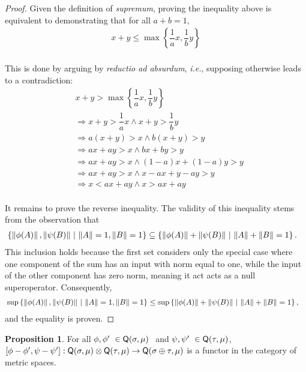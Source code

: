 \documentclass[10pt,a4paper]{amsart}
\theoremstyle{definition}
\theoremstyle{definition}
\theoremstyle{definition}
\theoremstyle{definition}
\newtheorem{proposition}[definition]{Proposition}
\theoremstyle{definition}
\theoremstyle{definition}
\begin{document}
\begin{proof}
Given the definition of \emph{supremum}, proving the inequality above is equivalent to demonstrating that for all $a+b=1$,
 \begin{align*} 
     x + y  \leq  \max \left\{   \dfrac{1}{a}x  ,   \dfrac{1}{b} y   \right\} \\
 \end{align*}
 
 This is done by arguing by \textit{reductio ad absurdum}, \textit{i.e.}, supposing otherwise leads to a contradiction:
 \begin{align*} 
     &
      x + y  >  \max \left\{   \dfrac{1}{a}x  ,   \dfrac{1}{b} y   \right\} \\
     & \Rightarrow  x + y > \dfrac{1}{a}x  \wedge x + y > \dfrac{1}{b}y \\
     & \Rightarrow  a (x + y) > x  \wedge b (x + y)> y \\
     & \Rightarrow  a x + a y > x  \wedge b x + by > y \\
     & \Rightarrow  a x + a y > x  \wedge (1-a) x + (1-a)y > y\\
     & \Rightarrow  a x + a y > x  \wedge x-ax + y -ay > y\\
     & \Rightarrow  x < a x + a y   \wedge x > a x + a y  \\
 \end{align*}

It remains to prove the reverse inequality. The validity of this inequality stems from the observation that
\begin{align*}
  & \left\{  \left\lVert \phi (A) \right\rVert,   \left\lVert \psi (B) \right\rVert  \, \vert \,   \left\lVert A \right\rVert = 1, \left\lVert B \right\rVert = 1 \right\}   \subseteq
 \left\{  \left\lVert \phi (A) \right\rVert + \left\lVert \psi (B) \right\rVert  \, \vert \,   \left\lVert A \right\rVert + \left\lVert B \right\rVert = 1 \right\}.
\end{align*}
This inclusion holds because the first set considers only the special case where one component of the sum has an input with norm equal to one, while the input of the other component has zero norm, meaning it act acts as a null superoperator. Consequently,
\begin{align*}
  & \sup \left\{  \left\lVert \phi (A) \right\rVert,   \left\lVert \psi (B) \right\rVert  \, \vert \,   \left\lVert A \right\rVert = 1, \left\lVert B \right\rVert = 1 \right\}   \leq
 \sup \left\{  \left\lVert \phi (A) \right\rVert + \left\lVert \psi (B) \right\rVert  \, \vert \,   \left\lVert A \right\rVert + \left\lVert B \right\rVert = 1 \right\},
\end{align*}
and the equality is proven.

\end{proof}


\begin{proposition} \label{prop:met_cond}
  For all $\phi, \phi' \in \catQ(\sigma,\mu)  $ and $\psi, \psi' \in \catQ(\tau,\mu) $, $[\phi-\phi',\psi-\psi']:\mathsf{Q}(\sigma,\mu) \otimes \mathsf{Q}(\tau,\mu) \rightarrow \mathsf{Q}(\sigma \oplus \tau,\mu) $ is a functor in the category of metric spaces.
\end{proposition}
\end{document}
